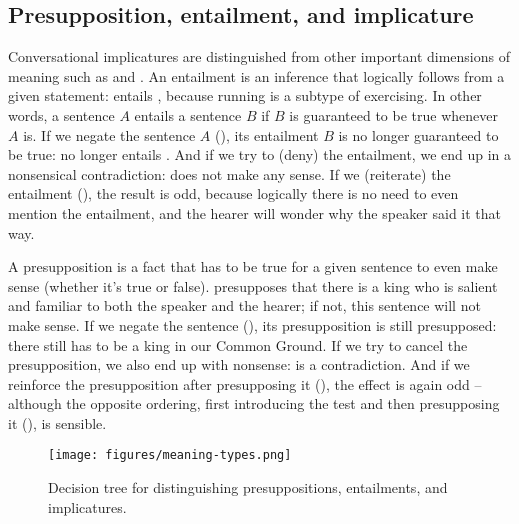 \subsection{Presupposition, entailment, and implicature}

Conversational implicatures are distinguished from other important dimensions of meaning such as  and .  An entailment is an inference that logically follows from a given statement:  entails , because running is a subtype of exercising.  In other words, a sentence $A$ entails a sentence $B$ if $B$ is guaranteed to be true whenever $A$ is.  If we negate the sentence $A$ (), its entailment $B$ is no longer guaranteed to be true:  no longer entails . And if we try to   (deny) the entailment, we end up in a nonsensical contradiction:  does not make any sense.   If we  (reiterate) the entailment (), the result is odd, because logically there is no need to even mention the entailment, and the hearer will wonder why the speaker said it that way.

A presupposition is a fact that has to be true for a given sentence to even make sense (whether it's true or false).   presupposes that there is a king who is salient and familiar to both the speaker and the hearer; if not, this sentence will not make sense.  If we negate the sentence (), its presupposition is still presupposed: there still has to be a king in our Common Ground.  If we try to cancel the presupposition, we also end up with nonsense:  is a contradiction.  And if we reinforce the presupposition after presupposing it (), the effect is again odd -- although the opposite ordering, first introducing the test and then presupposing it (), is sensible.

\begin{figure}[htb!]
\texttt{[image: figures/meaning-types.png]}
\caption{Decision tree for distinguishing presuppositions, entailments, and implicatures.}
\label{fig:meaning-types}
\end{figure}


